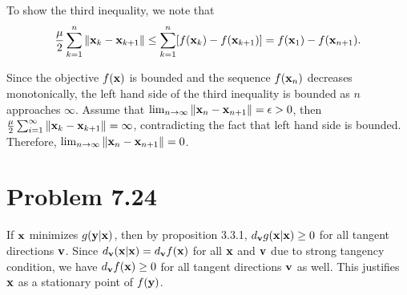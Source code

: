 \documentclass{scrartcl}
\begin{document}
To show the third inequality, we note that
\begin{equation}
{\mu \over 2} \sum_{k=1}^n \| \mathbf{x}_k - \mathbf{x}_{k+1} \| \le \sum_{k=1}^n [f(\mathbf{x}_k) - f(\mathbf{x}_{k+1})] = f(\mathbf{x}_1) - f(\mathbf{x}_{n+1}).
\end{equation}

Since the objective $f(\mathbf{x})$ is bounded and the sequence $f(\mathbf{x}_n)$ decreases monotonically, the left hand side of the third inequality is bounded as
$n$ approaches $\infty$. Assume that $\lim_{n \rightarrow \infty} \|\mathbf{x}_n - \mathbf{x}_{n+1}\| = \epsilon > 0$, then
${\mu \over 2} \sum_{i=1}^\infty \|\mathbf{x}_k - \mathbf{x}_{k+1}\| = \infty$, contradicting the fact that left hand side is bounded.
Therefore, $\lim_{n \rightarrow \infty} \|\mathbf{x}_n - \mathbf{x}_{n+1}\| = 0$.


\section*{Problem 7.24}

If $\mathbf{x}$ minimizes $g(\mathbf{y} | \mathbf{x})$, then by proposition 3.3.1, $d_{\mathbf{v}}g(\mathbf{x}|\mathbf{x}) \ge 0$ for all tangent directions $\mathbf{v}$.
Since $d_{\mathbf{v}}(\mathbf{x}|\mathbf{x}) = d_{\mathbf{v}}f(\mathbf{x})$ for all $\mathbf{x}$ and $\mathbf{v}$ due to strong tangency condition, we have $d_{\mathbf{v}}f(\mathbf{x}) \ge 0$
for all tangent directions $\mathbf{v}$ as well. This justifies $\mathbf{x}$ as a stationary point of $f(\mathbf{y})$.
\end{document}
